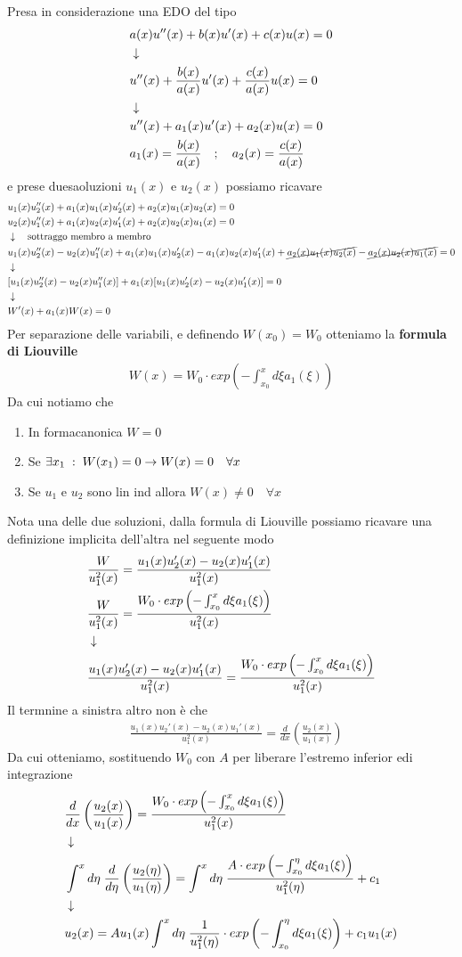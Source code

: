 Presa in considerazione una EDO del tipo
\begin{align}
	&a(x) u''(x) + b(x) u'(x) + c(x) u(x) = 0 \\ &\downarrow \nonumber \\
	&u''(x) + \frac{b(x)}{a(x)} u'(x) + \frac{c(x)}{a(x)} u(x) = 0\nonumber \\ &\downarrow \nonumber \\
	&u''(x) + a_1(x) u'(x) + a_2(x) u(x) = 0 \\
	&a_1(x) =  \frac{b(x)}{a(x)} \quad ; \quad a_2(x)=\frac{c(x)}{a(x)}
\end{align}
e prese duesaoluzioni $u_1(x)$ e $u_2(x)$ possiamo ricavare
\begin{align}
	&u_1(x)u_2''(x) + a_1(x) u_1(x)u_2'(x) + a_2(x) u_1(x)u_2(x) = 0 \\
	&u_2(x)u_1''(x) + a_1(x) u_2(x)u_1'(x) + a_2(x) u_2(x)u_1(x) = 0\\ &\downarrow \quad \text{sottraggo membro a membro} \nonumber \\
	&u_1(x)u_2''(x) - u_2(x)u_1''(x) + a_1(x) u_1(x)u_2'(x) - a_1(x) u_2(x)u_1'(x) + \cancel{ a_2(x) u_1(x)u_2(x)} - \cancel{a_2(x) u_2(x)u_1(x)} = 0 \nonumber \\ &\downarrow \nonumber \\
	&[u_1(x)u_2''(x) - u_2(x)u_1''(x)]+ a_1(x) [  u_1(x)u_2'(x) - u_2(x)u_1'(x)] = 0\nonumber \\ &\downarrow \nonumber \\
	&W'(x) + a_1(x)W(x) = 0
\end{align}
Per separazione delle variabili, e definendo $W(x_0)=W_0$ otteniamo la \textbf{formula di Liouville}
\begin{align}
	W(x) = W_0\cdot exp\left( -\int_{x_0}^{x} d\xi a_1(\xi) \right)
\end{align}
Da cui notiamo che
\begin{enumerate}
	\item In formacanonica $W=0$
	\item Se $\exists x_1 \; : \; W(x_1) = 0 \to W(x) = 0\quad\forall x$
	\item Se $u_1$ e $u_2$ sono lin ind allora $W(x) \neq 0 \quad \forall x$
\end{enumerate}
Nota una delle due soluzioni, dalla formula di Liouville possiamo ricavare una definizione implicita dell'altra nel seguente modo
\begin{align}
	&\frac{W}{u_1^2(x)} = \frac{u_1(x)u_2'(x) - u_2(x)u_1'(x)}{u_1^2(x)}\\
	&\frac{W}{u_1^2(x)} = \frac{W_0\cdot exp\left( -\int_{x_0}^{x} d\xi a_1(\xi) \right)}{u_1^2(x)} \\ &\downarrow \nonumber \\
	&\frac{u_1(x)u_2'(x) - u_2(x)u_1'(x)}{u_1^2(x)} = \frac{W_0\cdot exp\left( -\int_{x_0}^{x} d\xi a_1(\xi) \right)}{u_1^2(x)}
\end{align}
Il termnine a sinistra altro non è che 
\begin{align}
&\frac{u_1(x)u_2'(x) - u_2(x)u_1'(x)}{u_1^2(x)} = \frac{d}{dx} \left( \frac{u_2(x)}{u_1(x)} \right)
\end{align}
Da cui otteniamo, sostituendo $W_0$ con $A$ per liberare l'estremo inferior edi integrazione
\begin{align}
&\frac{d}{dx} \left( \frac{u_2(x)}{u_1(x)} \right) = \frac{W_0\cdot exp\left( -\int_{x_0}^{x} d\xi a_1(\xi) \right)}{u_1^2(x)} \\ &\downarrow \nonumber \\
& \int^x d\eta \; \frac{d}{d\eta} \left( \frac{u_2(\eta)}{u_1(\eta)} \right) =\int^x d\eta \; \frac{A \cdot exp\left( -\int_{x_0}^{\eta} d\xi a_1(\xi) \right)}{u_1^2(\eta)} + c_1 \nonumber \\ &\downarrow \nonumber \\
&u_2(x) = Au_1(x) \int^x d\eta \; \frac{1}{u_1^2(\eta)}\cdot exp\left( -\int_{x_0}^{\eta} d\xi a_1(\xi) \right) + c_1u_1(x)
\end{align}



